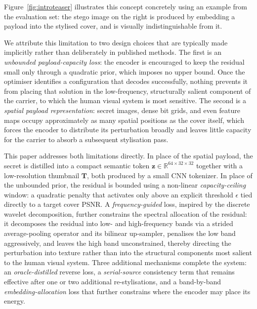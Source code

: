 \documentclass[runningheads]{llncs}
\begin{document}
Figure~\ref{fig:introteaser} illustrates this concept concretely using an example from the evaluation set: the stego image on the right is produced by embedding a payload into the stylised cover, and is visually indistinguishable from it.

We attribute this limitation to two design choices that are typically made implicitly rather than deliberately in published methods. The first is an \emph{unbounded payload-capacity loss}: the encoder is encouraged to keep the residual small only through a quadratic prior, which imposes no upper bound. Once the optimiser identifies a configuration that decodes successfully, nothing prevents it from placing that solution in the low-frequency, structurally salient component of the carrier, to which the human visual system is most sensitive. The second is a \emph{spatial payload representation}: secret images, dense bit grids, and even feature maps occupy approximately as many spatial positions as the cover itself, which forces the encoder to distribute its perturbation broadly and leaves little capacity for the carrier to absorb a subsequent stylisation pass.

This paper addresses both limitations directly. In place of the spatial payload, the secret is distilled into a compact semantic token $\mathbf{z}\!\in\!\mathbb{R}^{64\times32\times32}$ together with a low-resolution thumbnail $\mathbf{T}$, both produced by a small CNN tokenizer. In place of the unbounded prior, the residual is bounded using a non-linear \emph{capacity-ceiling} window: a quadratic penalty that activates only above an explicit threshold $\epsilon$ tied directly to a target cover PSNR. A \emph{frequency-guided} loss, inspired by the discrete wavelet decomposition, further constrains the spectral allocation of the residual: it decomposes the residual into low- and high-frequency bands via a strided average-pooling operator and its bilinear up-sampler, penalises the low band aggressively, and leaves the high band unconstrained, thereby directing the perturbation into texture rather than into the structural components most salient to the human visual system. Three additional mechanisms complete the system: an \emph{oracle-distilled} reverse loss, a \emph{serial-source} consistency term that remains effective after one or two additional re-stylisations, and a band-by-band \emph{embedding-allocation} loss that further constrains where the encoder may place its energy.
\end{document}
